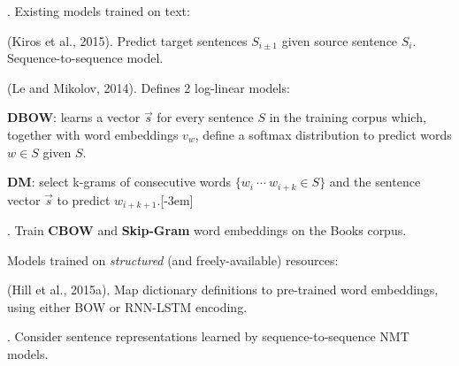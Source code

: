 \documentclass[11pt]{article}
\begin{document}
\myspace
\p {}. Existing models trained on text:
\begin{compactitem}
	\item {} (Kiros et al., 2015). Predict target sentences $S_{i \pm 1}$ given source sentence $S_i$. Sequence-to-sequence model.
	
	\item {} (Le and Mikolov, 2014). Defines 2 log-linear models:
	\begin{compactenum}
		\item \textbf{DBOW}: learns a vector $\vec{s}$ for every sentence $S$ in the training corpus which, together with word embeddings $v_w$, define a softmax distribution to predict words $w \in S$ given $S$. 
		
		\item \textbf{DM}: select k-grams of consecutive words $\{w_i ~ \cdots ~ w_{i + k} \in S \}$ and the sentence vector $\vec{s}$ to predict $w_{i + k + 1}$.
	\end{compactenum}
	
	\item {}. Train \textbf{CBOW} and \textbf{Skip-Gram} word embeddings on the Books corpus.
\end{compactitem}
\vspace{1em}

\p Models trained on \textit{structured} (and freely-available) resources:
\begin{compactitem}
	\item {} (Hill et al., 2015a). Map dictionary definitions to pre-trained word embeddings, using either BOW or RNN-LSTM encoding.
	
	\item {}. Consider sentence representations learned by sequence-to-sequence NMT models.
\end{compactitem}
\end{document}
